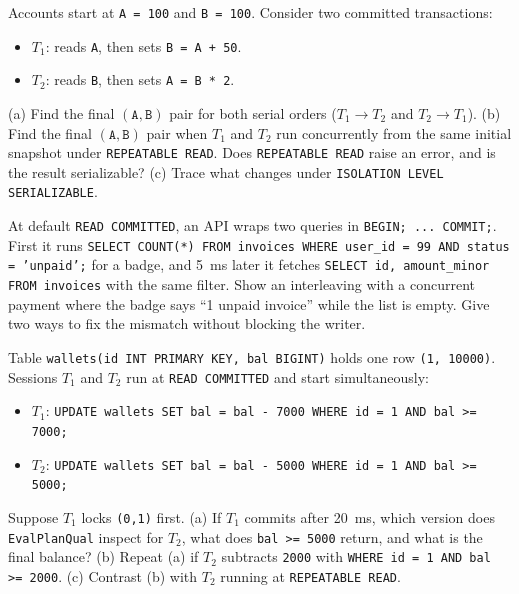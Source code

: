\begin{exercise}
Accounts start at \texttt{A = 100} and \texttt{B = 100}. Consider two committed transactions:
\begin{itemize}
  \item $T_1$: reads \texttt{A}, then sets \texttt{B = A + 50}.
  \item $T_2$: reads \texttt{B}, then sets \texttt{A = B * 2}.
\end{itemize}
(a) Find the final $(\texttt{A}, \texttt{B})$ pair for both serial orders ($T_1 \to T_2$ and $T_2 \to T_1$).
(b) Find the final $(\texttt{A}, \texttt{B})$ pair when $T_1$ and $T_2$ run concurrently from the same initial snapshot under \texttt{REPEATABLE READ}. Does \texttt{REPEATABLE READ} raise an error, and is the result serializable?
(c) Trace what changes under \texttt{ISOLATION LEVEL SERIALIZABLE}.
\end{exercise}

\begin{exercise}
At default \texttt{READ COMMITTED}, an API wraps two queries in \texttt{BEGIN; ... COMMIT;}. First it runs \texttt{SELECT COUNT(*) FROM invoices WHERE user\_id = 99 AND status = 'unpaid';} for a badge, and 5~ms later it fetches \texttt{SELECT id, amount\_minor FROM invoices} with the same filter. Show an interleaving with a concurrent payment where the badge says ``1 unpaid invoice'' while the list is empty. Give two ways to fix the mismatch without blocking the writer.
\end{exercise}

\begin{exercise}
Table \texttt{wallets(id INT PRIMARY KEY, bal BIGINT)} holds one row \texttt{(1, 10000)}. Sessions $T_1$ and $T_2$ run at \texttt{READ COMMITTED} and start simultaneously:
\begin{itemize}
  \item $T_1$: \texttt{UPDATE wallets SET bal = bal - 7000 WHERE id = 1 AND bal >= 7000;}
  \item $T_2$: \texttt{UPDATE wallets SET bal = bal - 5000 WHERE id = 1 AND bal >= 5000;}
\end{itemize}
Suppose $T_1$ locks \texttt{(0,1)} first.
(a) If $T_1$ commits after 20~ms, which version does \texttt{EvalPlanQual} inspect for $T_2$, what does \texttt{bal >= 5000} return, and what is the final balance?
(b) Repeat (a) if $T_2$ subtracts \texttt{2000} with \texttt{WHERE id = 1 AND bal >= 2000}.
(c) Contrast (b) with $T_2$ running at \texttt{REPEATABLE READ}.
\end{exercise}

